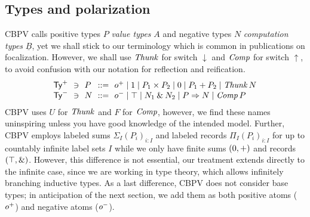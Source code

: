 \documentclass[sigplan,screen,fleqn,review]{acmart} %
\begin{document}
\subsection{Types and polarization}

CBPV calls positive types $P$ \emph{value types} $A$ and negative
types $N$
\emph{computation types} $\underline B$,
yet we shall stick to our terminology
which is common in publications on focalization.
However, we shall use $\mathit{Thunk}$ for switch $\downarrow$ and $\mathit{Comp}$ for
switch $\uparrow$, to avoid confusion with our notation for reflection
and reification.
\[
\begin{array}{l@{~~}l@{~~}l@{~~}r@{~~}l}%
  \PTy & \ni & P & ::= & \patom
    \mid \tyone \mid P_1 \times P_2
    \mid \tyzero \mid P_1 + P_2
    \mid \Thunk N
\\
  \NTy & \ni & N & ::= & \natom
    \mid \top \mid N_1 \ntimes N_2
    \mid P \To N
    \mid \Comp P
\\
\end{array}
\]
CBPV uses $U$ for $\mathit{Thunk}$ and $F$ for $\mathit{Comp}$, however, we find
these names uninspiring unless you have good knowledge of the intended
model.  Further, CBPV \cite{levy:hosc06}
employs labeled sums $\Sigma_I (P_i)_{i : I}$
and labeled records $\Pi_I (P_i)_{i : I}$ for up to countably infinite
label sets $I$ while we only have finite sums $(0,+)$ and
records $(\top,\mathbin{\&})$.  However, this difference is not essential,
our treatment extends directly to the infinite case, since we are
working in type theory, which allows infinitely branching inductive
types.   As a last difference, CBPV does not consider base types; in
anticipation of the next section, we add them as both positive atoms
($o^+$) and negative atoms ($o^-$).
\end{document}
